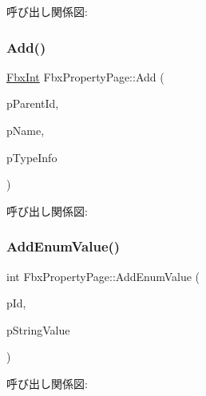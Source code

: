 呼び出し関係図\+:
\mbox{\label{class_fbx_property_page_a96c5b9945595bc33ff1027211e2e2ffb}} 
\subsubsection{\texorpdfstring{Add()}{Add()}\hspace{0.1cm}{\footnotesize\ttfamily [2/2]}}
{\footnotesize\ttfamily \hyperlink{fbxtypes_8h_a088fa96de3b0b3ea69f0f6afef525dfb}{Fbx\+Int} Fbx\+Property\+Page\+::\+Add (\begin{DoxyParamCaption}\item[{\hyperlink{fbxtypes_8h_a088fa96de3b0b3ea69f0f6afef525dfb}{Fbx\+Int}}]{p\+Parent\+Id,  }\item[{const char $\ast$}]{p\+Name,  }\item[{\hyperlink{class_fbx_property_page}{Fbx\+Property\+Page} $\ast$}]{p\+Type\+Info }\end{DoxyParamCaption})}

呼び出し関係図\+:
\mbox{\label{class_fbx_property_page_a966b4958ccd7d932772c719b30221d67}} 
\subsubsection{\texorpdfstring{Add\+Enum\+Value()}{AddEnumValue()}}
{\footnotesize\ttfamily int Fbx\+Property\+Page\+::\+Add\+Enum\+Value (\begin{DoxyParamCaption}\item[{\hyperlink{fbxtypes_8h_a088fa96de3b0b3ea69f0f6afef525dfb}{Fbx\+Int}}]{p\+Id,  }\item[{const char $\ast$}]{p\+String\+Value }\end{DoxyParamCaption})}

呼び出し関係図\+:
\mbox{\label{class_fbx_property_page_a13c717963c497a3cb6b4fc89a2793d8c}} 
